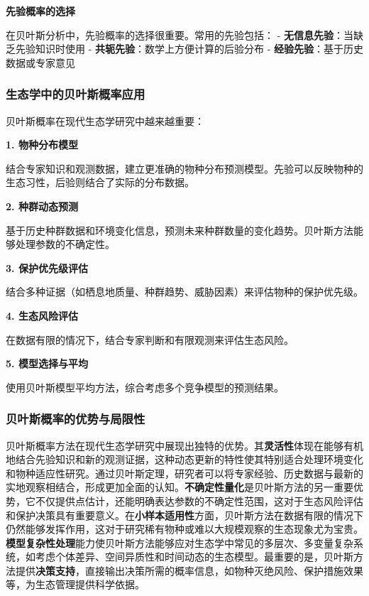 \documentclass[
]{book}
\begin{document}
\textbf{先验概率的选择}

在贝叶斯分析中，先验概率的选择很重要。常用的先验包括：
- \textbf{无信息先验}：当缺乏先验知识时使用
- \textbf{共轭先验}：数学上方便计算的后验分布
- \textbf{经验先验}：基于历史数据或专家意见

\hypertarget{ux751fux6001ux5b66ux4e2dux7684ux8d1dux53f6ux65afux6982ux7387ux5e94ux7528}{%
\subsubsection{生态学中的贝叶斯概率应用}\label{ux751fux6001ux5b66ux4e2dux7684ux8d1dux53f6ux65afux6982ux7387ux5e94ux7528}}

贝叶斯概率在现代生态学研究中越来越重要：

\textbf{1. 物种分布模型}

结合专家知识和观测数据，建立更准确的物种分布预测模型。先验可以反映物种的生态习性，后验则结合了实际的分布数据。

\textbf{2. 种群动态预测}

基于历史种群数据和环境变化信息，预测未来种群数量的变化趋势。贝叶斯方法能够处理参数的不确定性。

\textbf{3. 保护优先级评估}

结合多种证据（如栖息地质量、种群趋势、威胁因素）来评估物种的保护优先级。

\textbf{4. 生态风险评估}

在数据有限的情况下，结合专家判断和有限观测来评估生态风险。

\textbf{5. 模型选择与平均}

使用贝叶斯模型平均方法，综合考虑多个竞争模型的预测结果。

\hypertarget{ux8d1dux53f6ux65afux6982ux7387ux7684ux4f18ux52bfux4e0eux5c40ux9650ux6027}{%
\subsubsection{贝叶斯概率的优势与局限性}\label{ux8d1dux53f6ux65afux6982ux7387ux7684ux4f18ux52bfux4e0eux5c40ux9650ux6027}}

贝叶斯概率方法在现代生态学研究中展现出独特的优势。其\textbf{灵活性}体现在能够有机地结合先验知识和新的观测证据，这种动态更新的特性使其特别适合处理环境变化和物种适应性研究。通过贝叶斯定理，研究者可以将专家经验、历史数据与最新的实地观察相结合，形成更加全面的认知。\textbf{不确定性量化}是贝叶斯方法的另一重要优势，它不仅提供点估计，还能明确表达参数的不确定性范围，这对于生态风险评估和保护决策具有重要意义。在\textbf{小样本适用性}方面，贝叶斯方法在数据有限的情况下仍然能够发挥作用，这对于研究稀有物种或难以大规模观察的生态现象尤为宝贵。\textbf{模型复杂性处理}能力使贝叶斯方法能够应对生态学中常见的多层次、多变量复杂系统，如考虑个体差异、空间异质性和时间动态的生态模型。最重要的是，贝叶斯方法提供\textbf{决策支持}，直接输出决策所需的概率信息，如物种灭绝风险、保护措施效果等，为生态管理提供科学依据。
\end{document}

